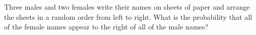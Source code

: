 Three males and two females write their names on sheets of paper and arrange the sheets in a random order from left to right. What is the probability that all of the female names appear to the right of all of the male names?
